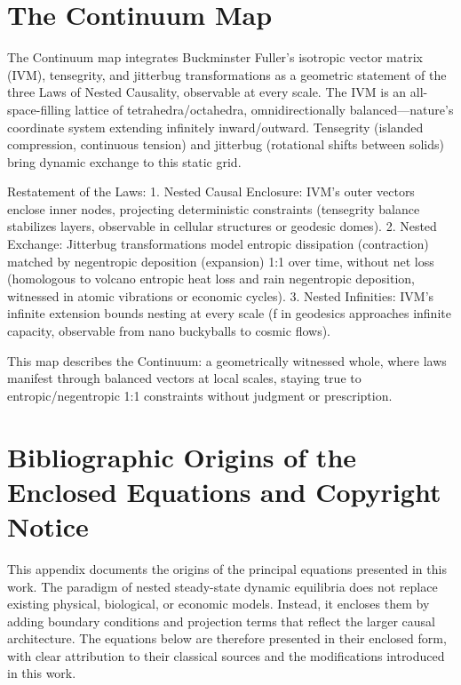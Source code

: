 \chapter{The Continuum Map}

The Continuum map integrates Buckminster Fuller's isotropic vector matrix (IVM), tensegrity, and jitterbug transformations as a geometric statement of the three Laws of Nested Causality, observable at every scale. The IVM is an all-space-filling lattice of tetrahedra/octahedra, omnidirectionally balanced—nature's coordinate system extending infinitely inward/outward. Tensegrity (islanded compression, continuous tension) and jitterbug (rotational shifts between solids) bring dynamic exchange to this static grid.

Restatement of the Laws:  
1. Nested Causal Enclosure: IVM's outer vectors enclose inner nodes, projecting deterministic constraints (tensegrity balance stabilizes layers, observable in cellular structures or geodesic domes).  
2. Nested Exchange: Jitterbug transformations model entropic dissipation (contraction) matched by negentropic deposition (expansion) 1:1 over time, without net loss (homologous to volcano entropic heat loss and rain negentropic deposition, witnessed in atomic vibrations or economic cycles).  
3. Nested Infinities: IVM's infinite extension bounds nesting at every scale (f \to \infty in geodesics approaches infinite capacity, observable from nano buckyballs to cosmic flows).

This map describes the Continuum: a geometrically witnessed whole, where laws manifest through balanced vectors at local scales, staying true to entropic/negentropic 1:1 constraints without judgment or prescription.

\chapter{Bibliographic Origins of the Enclosed Equations and Copyright Notice}

This appendix documents the origins of the principal equations presented in this work. The paradigm of nested steady-state dynamic equilibria does not replace existing physical, biological, or economic models. Instead, it encloses them by adding boundary conditions and projection terms that reflect the larger causal architecture. The equations below are therefore presented in their enclosed form, with clear attribution to their classical sources and the modifications introduced in this work.

